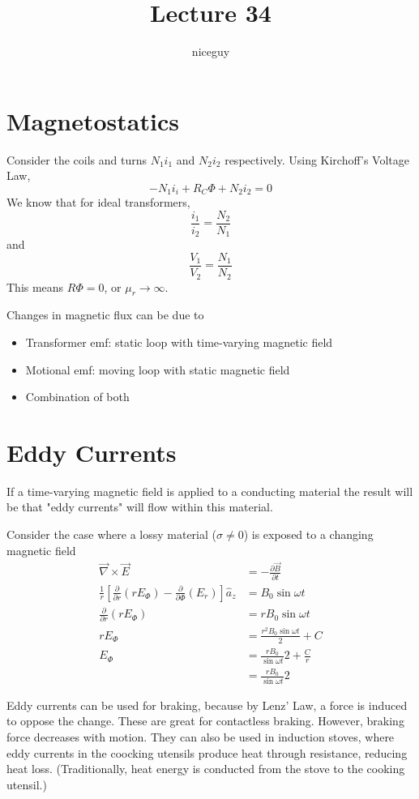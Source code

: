 \documentclass[12pt]{article}
\author{niceguy}
\title{Lecture 34}
\begin{document}
\maketitle

\section{Magnetostatics}

\begin{ex}
    Consider the coils and turns $N_1i_1$ and $N_2i_2$ respectively. Using Kirchoff's Voltage Law,
    $$-N_1i_i + R_C\Phi + N_2i_2 = 0$$
    We know that for ideal transformers,
    $$\frac{i_1}{i_2} = \frac{N_2}{N_1}$$
    and
    $$\frac{V_1}{V_2} = \frac{N_1}{N_2}$$
    This means $R\Phi = 0$, or $\mu_r \rightarrow \infty$.
\end{ex}

Changes in magnetic flux can be due to
\begin{itemize}
    \item Transformer emf: static loop with time-varying magnetic field
    \item Motional emf: moving loop with static magnetic field
    \item Combination of both
\end{itemize}

\section{Eddy Currents}

If a time-varying magnetic field is applied to a conducting material the result will be that "eddy currents" will flow within this material.

\begin{ex}
    Consider the case where a lossy material ($\sigma \neq 0$) is exposed to a changing magnetic field
    \begin{align*}
        \vec\nabla \times \vec E &= -\frac{\partial \vec B}{\partial t} \\
        \frac{1}{r}[\frac{\partial}{\partial r} (rE_\Phi) - \frac{\partial}{\partial\Phi}(E_r)] \hat a_z &= B_0\sin\omega t \\
        \frac{\partial}{\partial r}(rE_\Phi) &= rB_0\sin\omega t \\
        rE_\Phi &= \frac{r^2B_0\sin\omega t}{2} + C \\
        E_\Phi &= \frac{rB_0}{\sin\omega t}{2} + \frac{C}{r} \\
               &= \frac{rB_0}{\sin\omega t}{2}
    \end{align*}
\end{ex}

Eddy currents can be used for braking, because by Lenz' Law, a force is induced to oppose the change. These are great for contactless braking. However, braking force decreases with motion. They can also be used in induction stoves, where eddy currents in the coocking utensils produce heat through resistance, reducing heat loss. (Traditionally, heat energy is conducted from the stove to the cooking utensil.)
\end{document}
